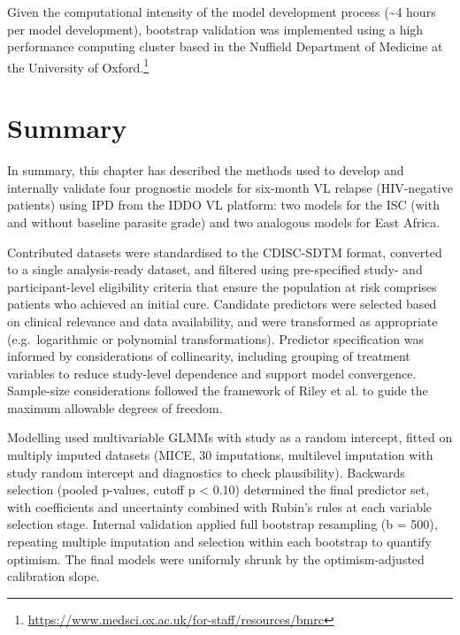 Given the computational intensity of the model development process (\textasciitilde 4 hours per model development), bootstrap validation was implemented using a high performance computing cluster based in the Nuffield Department of Medicine at the University of Oxford.\footnote{\url{https://www.medsci.ox.ac.uk/for-staff/resources/bmrc}}

\section{Summary}

In summary, this chapter has described the methods used to develop and internally validate four prognostic models for six-month VL relapse (HIV-negative patients) using IPD from the IDDO VL platform: two models for the ISC (with and without baseline parasite grade) and two analogous models for East Africa.

Contributed datasets were standardised to the CDISC-SDTM format, converted to a single analysis-ready dataset, and filtered using pre-specified study- and participant-level eligibility criteria that ensure the population at risk comprises patients who achieved an initial cure. Candidate predictors were selected based on clinical relevance and data availability, and were transformed as appropriate (e.g.\ logarithmic or polynomial transformations). Predictor specification was informed by considerations of collinearity, including grouping of treatment variables to reduce study-level dependence and support model convergence. Sample-size considerations followed the framework of Riley et al. to guide the maximum allowable degrees of freedom.

Modelling used multivariable GLMMs with study as a random intercept, fitted on multiply imputed datasets (MICE, 30 imputations, multilevel imputation with study random intercept and diagnostics to check plausibility). Backwards selection (pooled p-values, cutoff p < 0.10) determined the final predictor set, with coefficients and uncertainty combined with Rubin's rules at each variable selection stage. Internal validation applied full bootstrap resampling (b = 500), repeating multiple imputation and selection within each bootstrap to quantify optimism. The final models were uniformly shrunk by the optimism-adjusted calibration slope.
